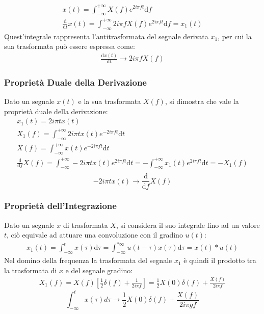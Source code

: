 \documentclass{article}
\newcommand{\df}{\mathrm{d}}
\numberwithin{equation}{subsection}
\begin{document}
\begin{gather*}
    x(t)=\displaystyle\int_{-\infty}^{+\infty}X(f)e^{2i\pi ft}\df f\\
    \displaystyle\frac{\df}{\df t}x(t)=\int_{-\infty}^{+\infty}2i\pi fX(f)e^{2i\pi ft}\df f=x_1(t)
\end{gather*}
Quest'integrale rappresenta l'antitrasformata del segnale derivata $x_1$, per cui la sua trasformata può essere espressa come:
\begin{gather} 
    \displaystyle\frac{\df x(t)}{\df t}\to2i\pi fX(f)
\end{gather}

\subsubsection{Proprietà Duale della Derivazione}
Dato un segnale $x(t)$ e la sua trasformata $X(f)$, si dimostra che vale la proprietà duale della derivazione: 
\begin{gather*}
    x_1(t)=2i\pi tx(t)\\
    X_1(f)=\displaystyle\int_{-\infty}^{+\infty}2i\pi tx(t)e^{-2i\pi ft}\df t\\
    X(f)=\displaystyle\int_{-\infty}^{+\infty}x(t)e^{-2i\pi ft}\df t\\
    \displaystyle\frac{\df}{\df f}X(f)=\int_{-\infty}^{+\infty}-2i\pi t x(t)e^{2i\pi ft}\df t=-\int_{-\infty}^{+\infty}x_1(t)e^{2i\pi ft}\df t=-X_1(f)\\
\end{gather*}
\begin{equation}
    -2i\pi tx(t)\to\displaystyle\frac{\df}{\df f}X(f)
\end{equation}

\subsubsection{Proprietà dell'Integrazione}

Dato un segnale $x$ di trasformata $X$, si considera il suo integrale fino ad un valore $t$, ciò equivale ad attuare una convoluzione con il gradino $u(t)$:
\begin{gather*}
    x_1(t)=\displaystyle\int_{-\infty}^{t}x(\tau)\df\tau=\int_{-\infty}^{*\infty}u(t-\tau)x(\tau)\df\tau=x(t)*u(t)
\end{gather*}
Nel domino della frequenza la trasformata del segnale $x_1$ è quindi il prodotto tra la trasformata di $x$ e del segnale gradino:
\begin{gather*}
    X_1(f)=X(f)\left[\displaystyle\frac{1}{2}\delta(f)+\frac{1}{2i\pi f}\right]=\frac{1}{2}X(0)\delta(f)+\frac{X(f)}{2i\pi f}
\end{gather*}
\begin{equation}
    \displaystyle\int_{-\infty}^tx(\tau)d\tau\to\frac{1}{2}X(0)\delta(f)+\frac{X(f)}{2i\pi gf}
\end{equation}
\end{document}
